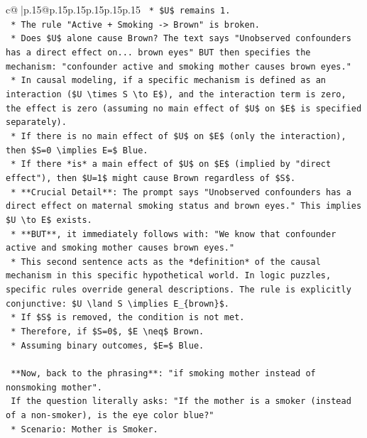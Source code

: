 \documentclass{article}
\begin{document}
{\begin{supertabular}{c@{$\;$}|p{.15\linewidth}@{}p{.15\linewidth}p{.15\linewidth}p{.15\linewidth}p{.15\linewidth}p{.15\linewidth}}
{{{\texttt{    *   \$U\$ remains 1.} \\
\texttt{    *   The rule "Active + Smoking {-}> Brown" is broken.} \\
\texttt{    *   Does \$U\$ alone cause Brown? The text says "Unobserved confounders has a direct effect on... brown eyes" BUT then specifies the mechanism: "confounder active and smoking mother causes brown eyes."} \\
\texttt{    *   In causal modeling, if a specific mechanism is defined as an interaction (\$U \textbackslash{}times S \textbackslash{}to E\$), and the interaction term is zero, the effect is zero (assuming no main effect of \$U\$ on \$E\$ is specified separately).} \\
\texttt{    *   If there is no main effect of \$U\$ on \$E\$ (only the interaction), then \$S=0 \textbackslash{}implies E=\$ Blue.} \\
\texttt{    *   If there *is* a main effect of \$U\$ on \$E\$ (implied by "direct effect"), then \$U=1\$ might cause Brown regardless of \$S\$.} \\
\texttt{    *   **Crucial Detail**: The prompt says "Unobserved confounders has a direct effect on maternal smoking status and brown eyes." This implies \$U \textbackslash{}to E\$ exists.} \\
\texttt{    *   **BUT**, it immediately follows with: "We know that confounder active and smoking mother causes brown eyes."} \\
\texttt{    *   This second sentence acts as the *definition* of the causal mechanism in this specific hypothetical world. In logic puzzles, specific rules override general descriptions. The rule is explicitly conjunctive: \$U \textbackslash{}land S \textbackslash{}implies E\_\{brown\}\$.} \\
\texttt{    *   If \$S\$ is removed, the condition is not met.} \\
\texttt{    *   Therefore, if \$S=0\$, \$E \textbackslash{}neq\$ Brown.} \\
\texttt{    *   Assuming binary outcomes, \$E=\$ Blue.} \\
\\ 
\texttt{    **Now, back to the phrasing**: "if smoking mother instead of nonsmoking mother".} \\
\texttt{    If the question literally asks: "If the mother is a smoker (instead of a non{-}smoker), is the eye color blue?"} \\
\texttt{    *   Scenario: Mother is Smoker.} \\
}}}
\end{supertabular}}
\end{document}
